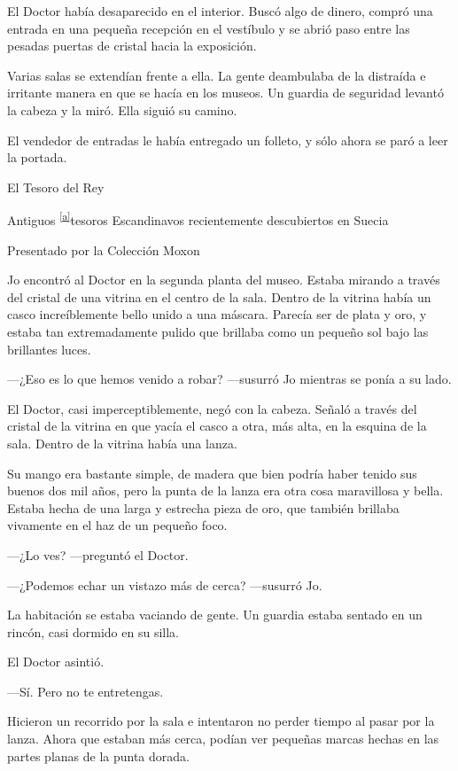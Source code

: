 El Doctor había desaparecido en el interior. Buscó algo de dinero,
compró una entrada en una pequeña recepción en el vestíbulo y se abrió
paso entre las pesadas puertas de cristal hacia la exposición.

Varias salas se extendían frente a ella. La gente deambulaba de la
distraída e irritante manera en que se hacía en los museos. Un guardia
de seguridad levantó la cabeza y la miró. Ella siguió su camino.

El vendedor de entradas le había entregado un folleto, y sólo ahora se
paró a leer la portada.

El Tesoro del Rey

Antiguos \textsuperscript{\hyperref[cmnt1]{{[}a{]}}}tesoros Escandinavos
recientemente descubiertos en Suecia

Presentado por la Colección Moxon

Jo encontró al Doctor en la segunda planta del museo. Estaba mirando a
través del cristal de una vitrina en el centro de la sala. Dentro de la
vitrina había un casco increíblemente bello unido a una máscara. Parecía
ser de plata y oro, y estaba tan extremadamente pulido que brillaba como
un pequeño sol bajo las brillantes luces.

---¿Eso es lo que hemos venido a robar? ---susurró Jo mientras se ponía
a su lado.

El Doctor, casi imperceptiblemente, negó con la cabeza. Señaló a través
del cristal de la vitrina en que yacía el casco a otra, más alta, en la
esquina de la sala. Dentro de la vitrina había una lanza.

Su mango era bastante simple, de madera que bien podría haber tenido sus
buenos dos mil años, pero la punta de la lanza era otra cosa maravillosa
y bella. Estaba hecha de una larga y estrecha pieza de oro, que también
brillaba vivamente en el haz de un pequeño foco.

---¿Lo ves? ---preguntó el Doctor.

---¿Podemos echar un vistazo más de cerca? ---susurró Jo.

La habitación se estaba vaciando de gente. Un guardia estaba sentado en
un rincón, casi dormido en su silla.

El Doctor asintió.

---Sí. Pero no te entretengas.

Hicieron un recorrido por la sala e intentaron no perder tiempo al pasar
por la lanza. Ahora que estaban más cerca, podían ver pequeñas marcas
hechas en las partes planas de la punta dorada.

